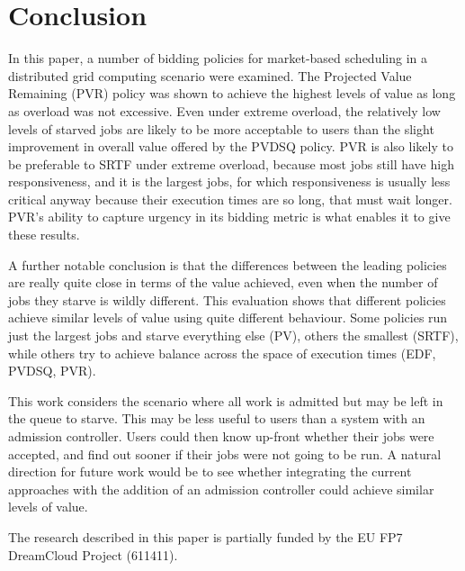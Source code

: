\documentclass[english,british]{IEEEtran}
\begin{document}
\section{Conclusion}

In this paper, a number of bidding policies for market-based scheduling
in a distributed grid computing scenario were examined. The Projected
Value Remaining (PVR) policy was shown to achieve the highest levels
of value as long as overload was not excessive. Even under extreme
overload, the relatively low levels of starved jobs are likely to
be more acceptable to users than the slight improvement in overall
value offered by the PVDSQ policy. PVR is also likely to be preferable
to SRTF under extreme overload, because most jobs still have high
responsiveness, and it is the largest jobs, for which responsiveness
is usually less critical anyway because their execution times are
so long, that must wait longer. PVR's ability to capture urgency in
its bidding metric is what enables it to give these results.

A further notable conclusion is that the differences between the leading
policies are really quite close in terms of the value achieved, even
when the number of jobs they starve is wildly different. This evaluation
shows that different policies achieve similar levels of value using
quite different behaviour. Some policies run just the largest jobs
and starve everything else (PV), others the smallest (SRTF), while
others try to achieve balance across the space of execution times
(EDF, PVDSQ, PVR).

This work considers the scenario where all work is admitted but may
be left in the queue to starve. This may be less useful to users than
a system with an admission controller. Users could then know up-front
whether their jobs were accepted, and find out sooner if their jobs
were not going to be run. A natural direction for future work would
be to see whether integrating the current approaches with the addition
of an admission controller could achieve similar levels of value.

\smallskip{}


The research described in this paper is partially funded by the EU
FP7 DreamCloud Project (611411).



\end{document}
